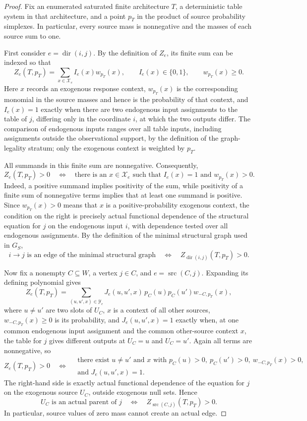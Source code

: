 \documentclass{article}
\begin{document}
\begin{proof}
Fix an enumerated saturated finite architecture \(T\), a deterministic table system in that architecture, and a point \(p_T\) in the product of source probability simplexes.  In particular, every source mass is nonnegative and the masses of each source sum to one.

First consider \(e=\operatorname{dir}(i,j)\).  By the definition of \(Z_e\), its finite sum can be indexed so that
\[
 Z_e(T,p_T)=\sum_{x\in\mathcal X_e} I_e(x)w_{p_T}(x),
 \qquad I_e(x)\in\{0,1\},
 \qquad w_{p_T}(x)\ge 0.
\]
Here \(x\) records an exogenous response context, \(w_{p_T}(x)\) is the corresponding monomial in the source masses and hence is the probability of that context, and \(I_e(x)=1\) exactly when there are two endogenous input assignments to the table of \(j\), differing only in the coordinate \(i\), at which the two outputs differ.  The comparison of endogenous inputs ranges over all table inputs, including assignments outside the observational support, by the definition of the graph-legality stratum; only the exogenous context is weighted by \(p_T\).

All summands in this finite sum are nonnegative.  Consequently,
\[
 Z_e(T,p_T)>0
 \quad\Longleftrightarrow\quad
 \text{there is an }x\in\mathcal X_e\text{ such that }
 I_e(x)=1\text{ and }w_{p_T}(x)>0.
\]
Indeed, a positive summand implies positivity of the sum, while positivity of a finite sum of nonnegative terms implies that at least one summand is positive.  Since \(w_{p_T}(x)>0\) means that \(x\) is a positive-probability exogenous context, the condition on the right is precisely actual functional dependence of the structural equation for \(j\) on the endogenous input \(i\), with dependence tested over all endogenous assignments.  By the definition of the minimal structural graph used in \(G_S\),
\[
 i\longrightarrow j\text{ is an edge of the minimal structural graph}
 \quad\Longleftrightarrow\quad
 Z_{\operatorname{dir}(i,j)}(T,p_T)>0.
\]

Now fix a nonempty \(C\subseteq W\), a vertex \(j\in C\), and \(e=\operatorname{src}(C,j)\).  Expanding its defining polynomial gives
\[
 Z_e(T,p_T)
 =\sum_{(u,u',x)\in\mathcal Y_e}
 J_e(u,u',x)\,p_C(u)p_C(u')w_{-C,p_T}(x),
\]
where \(u\ne u'\) are two slots of \(U_C\), \(x\) is a context of all other sources, \(w_{-C,p_T}(x)\ge0\) is its probability, and \(J_e(u,u',x)=1\) exactly when, at one common endogenous input assignment and the common other-source context \(x\), the table for \(j\) gives different outputs at \(U_C=u\) and \(U_C=u'\).  Again all terms are nonnegative, so
\[
 Z_e(T,p_T)>0
 \quad\Longleftrightarrow\quad
 \begin{gathered}
 \text{there exist }u\ne u'\text{ and }x\text{ with }
 p_C(u)>0,\ p_C(u')>0,\ w_{-C,p_T}(x)>0,\\
 \text{and }J_e(u,u',x)=1.
 \end{gathered}
\]
The right-hand side is exactly actual functional dependence of the equation for \(j\) on the exogenous source \(U_C\), outside exogenous null sets.  Hence
\[
 U_C\text{ is an actual parent of }j
 \quad\Longleftrightarrow\quad
 Z_{\operatorname{src}(C,j)}(T,p_T)>0.
\]
In particular, source values of zero mass cannot create an actual edge.


\end{proof}
\end{document}
